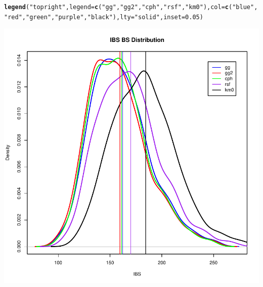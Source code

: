 \documentclass{article}\usepackage[]{graphicx}\usepackage[]{color}
\makeatletter
\def\maxwidth{ %
  \ifdim\Gin@nat@width>\linewidth
    \linewidth
  \else
    \Gin@nat@width
  \fi
}
\newcommand{\hlnum}[1]{\textcolor[rgb]{0.686,0.059,0.569}{#1}}%
\newcommand{\hlstr}[1]{\textcolor[rgb]{0.192,0.494,0.8}{#1}}%
\newcommand{\hlstd}[1]{\textcolor[rgb]{0.345,0.345,0.345}{#1}}%
\newcommand{\hlkwc}[1]{\textcolor[rgb]{0.333,0.667,0.333}{#1}}%
\newcommand{\hlkwd}[1]{\textcolor[rgb]{0.737,0.353,0.396}{\textbf{#1}}}%
\newenvironment{kframe}{%
 \def\at@end@of@kframe{}%
 \ifinner\ifhmode%
  \def\at@end@of@kframe{\end{minipage}}%
  \begin{minipage}{\columnwidth}%
 \fi\fi%
 \def\FrameCommand##1{\hskip\@totalleftmargin \hskip-\fboxsep
 \colorbox{shadecolor}{##1}\hskip-\fboxsep
     \hskip-\linewidth \hskip-\@totalleftmargin \hskip\columnwidth}%
 \MakeFramed {\advance\hsize-\width
   \@totalleftmargin\z@ \linewidth\hsize
   \@setminipage}}%
 {\par\unskip\endMakeFramed%
 \at@end@of@kframe}
\newenvironment{knitrout}{}{} %
\makeatother
\begin{document}
\begin{knitrout}
\begin{kframe}
\begin{alltt}
\hlkwd{legend}\hlstd{(}\hlstr{"topright"}\hlstd{,} \hlkwc{legend} \hlstd{=} \hlkwd{c}\hlstd{(}\hlstr{"gg"}\hlstd{,} \hlstr{"gg2"}\hlstd{,} \hlstr{"cph"}\hlstd{,} \hlstr{"rsf"}\hlstd{,} \hlstr{"km0"}\hlstd{),} \hlkwc{col} \hlstd{=} \hlkwd{c}\hlstd{(}\hlstr{"blue"}\hlstd{,}
    \hlstr{"red"}\hlstd{,} \hlstr{"green"}\hlstd{,} \hlstr{"purple"}\hlstd{,} \hlstr{"black"}\hlstd{),} \hlkwc{lty} \hlstd{=} \hlstr{"solid"}\hlstd{,} \hlkwc{inset} \hlstd{=} \hlnum{0.05}\hlstd{)}
\end{alltt}
\end{kframe}

{\centering \includegraphics[width=\maxwidth]{figure/model-selection-ibs-2} 

}



\end{knitrout}
\end{document}
